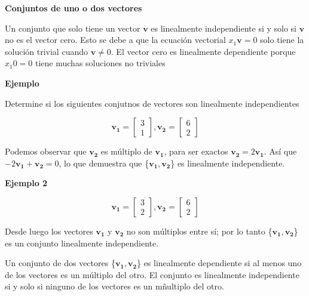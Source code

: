 \documentclass{article}
\begin{document}
\begin{large}
    \textbf{Conjuntos de uno o dos vectores}
\end{large}
Un conjunto que solo tiene un vector $\mathbf{v}$ es linealmente independiente si y solo si $\mathbf{v}$ no es el vector cero. Esto se debe a que la ecuación vectorial $x_1\mathbf{v} = 0$ solo tiene la solución trivial cuando $\mathbf{v} \neq 0$. El vector cero es linealmente dependiente porque $x_{1}0=0$
tiene muchas soluciones no triviales

\begin{large}
    \textbf{Ejemplo}
\end{large}

Determine si los siguientes conjutnos de vectores son linealmente independientes

\begin{equation*}
    \mathbf{v_1} = \begin{bmatrix} 3\\1  \end{bmatrix},
    \mathbf{v_2} = \begin{bmatrix} 6\\2  \end{bmatrix}
\end{equation*}

Podemos observar que $\mathbf{v_2}$ es múltiplo de $\mathbf{v_1}$, para ser exactos $\mathbf{v_2} = 2\mathbf{v_1}$. Así que $-2\mathbf{v_1} + \mathbf{v_2}= 0$, lo que demuestra que \{$\mathbf{v_1}, \mathbf{v_2}$\} es linealmente independiente.

\begin{large}
    \textbf{Ejemplo 2}
\end{large}

\begin{equation*}
    \mathbf{v_1} = \begin{bmatrix} 3\\2  \end{bmatrix},
    \mathbf{v_2} = \begin{bmatrix} 6\\2  \end{bmatrix}
\end{equation*}

Desde luego los vectores $\mathbf{v_1}$ y $\mathbf{v_2}$ no son múltiplos entre sí; por lo tanto \{$\mathbf{v_1}, \mathbf{v_2}$\} es un conjunto linealmente independiente.

\begin{tcolorbox}[colback=red!10!white, colframe=red!70!black, title=Conjunto de 2 vectores]
    Un conjunto de dos vectores \{$\mathbf{v_1}, \mathbf{v_2}$\} es linealmente dependiente si al menos uno de los vectores es un múltiplo del otro. El conjunto es linealmente independiente si y solo si ninguno de los vectores es un mñultiplo del otro.
\end{tcolorbox}
\end{document}
